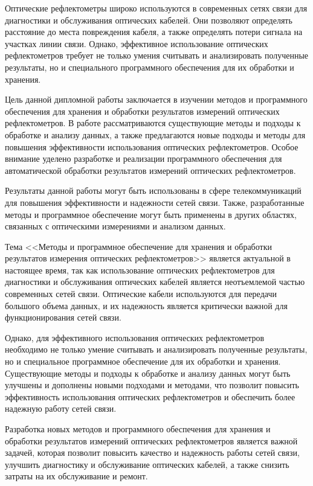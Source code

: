 \documentclass[a4paper]{article}
\begin{document}
Оптические рефлектометры широко используются в современных сетях связи для диагностики и обслуживания оптических кабелей. Они позволяют определять расстояние до места повреждения кабеля, а также определять потери сигнала на участках линии связи. Однако, эффективное использование оптических рефлектометров требует не только умения считывать и анализировать полученные результаты, но и специального программного обеспечения для их обработки и хранения.

Цель данной дипломной работы заключается в изучении методов и программного обеспечения для хранения и обработки результатов измерений оптических рефлектометров. В работе рассматриваются существующие методы и подходы к обработке и анализу данных, а также предлагаются новые подходы и методы для повышения эффективности использования оптических рефлектометров. Особое внимание уделено разработке и реализации программного обеспечения для автоматической обработки результатов измерений оптических рефлектометров.

Результаты данной работы могут быть использованы в сфере телекоммуникаций для повышения эффективности и надежности сетей связи. Также, разработанные методы и программное обеспечение могут быть применены в других областях, связанных с оптическими измерениями и анализом данных.

Тема <<Методы и программное обеспечение для хранения и обработки результатов измерения оптических рефлектометров>> является актуальной в настоящее время, так как использование оптических рефлектометров для диагностики и обслуживания оптических кабелей является неотъемлемой частью современных сетей связи. Оптические кабели используются для передачи большого объема данных, и их надежность является критически важной для функционирования сетей связи.

Однако, для эффективного использования оптических рефлектометров необходимо не только умение считывать и анализировать полученные результаты, но и специальное программное обеспечение для их обработки и хранения. Существующие методы и подходы к обработке и анализу данных могут быть улучшены и дополнены новыми подходами и методами, что позволит повысить эффективность использования оптических рефлектометров и обеспечить более надежную работу сетей связи.

Разработка новых методов и программного обеспечения для хранения и обработки результатов измерений оптических рефлектометров является важной задачей, которая позволит повысить качество и надежность работы сетей связи, улучшить диагностику и обслуживание оптических кабелей, а также снизить затраты на их обслуживание и ремонт. 
\end{document}
